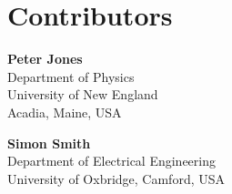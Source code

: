 
\chapter*{Contributors}
 


{\parskip=12pt

\noindent\textbf{Peter Jones}\\
Department of Physics\\
University of New England\\
Acadia, Maine, USA

\noindent\textbf{Simon Smith}\\
Department of Electrical Engineering\\
University of Oxbridge, 
Camford, USA

}
